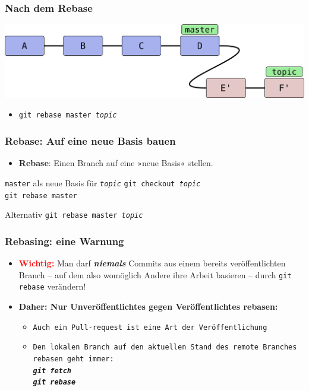 \documentclass{beamer}
\begin{document}
\begin{frame}
	\frametitle{Nach dem Rebase}



\begin{center}
\includegraphics[scale=0.12]{bilder/rebase-nachher.pdf}
\end{center}

\begin{itemize}
	\item \texttt{git rebase master \emph{topic}}
\end{itemize}


\end{frame}
\begin{frame}
\frametitle{Rebase: Auf eine neue Basis bauen}



\begin{itemize}
	\item \textbf{Rebase}: Einen Branch auf eine »neue Basis« stellen.
\end{itemize}
\begin{block}{\texttt{master} als neue Basis für \texttt{\emph{topic}}}
\texttt{git checkout \emph{topic}} \\
\texttt{git rebase master}
\end{block}

\begin{block}{Alternativ}
\texttt{git rebase master \emph{topic}}
\end{block}

\end{frame}
\begin{frame}
\frametitle{Rebasing: eine Warnung}

\begin{itemize}
	\item \textcolor{red}{\textbf{Wichtig:}} Man darf \textbf{\emph{niemals}} Commits aus einem bereits veröffentlichten Branch -- auf dem also womöglich Andere ihre Arbeit basieren -- durch \texttt{git rebase} verändern!
	\item \textbf{Daher: Nur Unveröffentlichtes gegen Veröffentlichtes rebasen:}
\begin{itemize}
	\item \texttt{Auch ein Pull-request ist eine Art der Veröffentlichung}
	\item \texttt{Den lokalen Branch auf den aktuellen Stand des remote Branches rebasen geht immer:\\ \textit{\textbf{git fetch}\\ \textbf{git rebase}}}
\end{itemize}
\end{itemize}

\end{frame}
\end{document}
